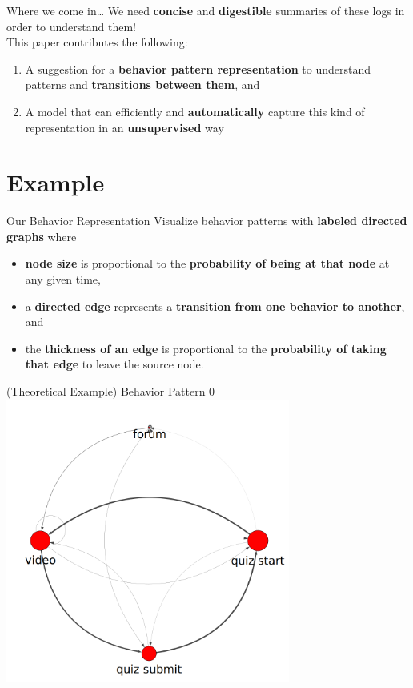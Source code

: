 \documentclass[10pt]{beamer}
\begin{document}
\begin{frame}{Where we come in\ldots}
    We need \textbf{\alert{concise}} and \textbf{\alert{digestible}}
    summaries of these logs in order to understand them!
    \\[\baselineskip]
    This paper contributes the following:
    \begin{enumerate}
      \item A suggestion for a \textbf{behavior pattern representation} to
       understand patterns and \textbf{transitions between them}, and
       \\[0.5\baselineskip]
      \item A model that can efficiently and \textbf{automatically} capture
       this kind of representation in an \textbf{unsupervised} way
    \end{enumerate}
\end{frame}

\section{Example}

\begin{frame}{Our Behavior Representation}
  Visualize behavior patterns with \textbf{labeled directed graphs} where
  \begin{itemize}
      \item \textbf{node size} is proportional to the \textbf{probability
          of being at that node} at any given time,
          \\[\baselineskip]
      \item a \textbf{directed edge} represents a \textbf{transition from one behavior to
          another}, and
          \\[\baselineskip]
      \item the \textbf{thickness of an edge} is proportional to the
          \textbf{probability of taking that edge} to leave the source node.
  \end{itemize}
\end{frame}

\begin{frame}{(Theoretical Example) Behavior Pattern 0}
  \centering
  \includegraphics[width=0.7\textwidth]{../figures/example/state0.png}
\end{frame}
\end{document}
